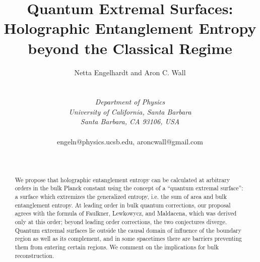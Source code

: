 \documentclass[12pt]{article}
\theoremstyle{remark}
\numberwithin{equation}{section}
\numberwithin{equation}{section}
\begin{document}
\allowdisplaybreaks

\normalem

\title{Quantum Extremal Surfaces: Holographic Entanglement Entropy beyond the Classical Regime}

\author{Netta Engelhardt and Aron C. Wall
\\ 
\\ \\
  \textit{Department of Physics}\\
\textit{University of California, Santa Barbara}\\
\textit{ Santa Barbara, CA 93106, USA} \\ 
 \\ 
\small{engeln@physics.ucsb.edu, aroncwall@gmail.com}}



\date{\ }



\maketitle 


\begin{abstract}
We propose that holographic entanglement entropy can be calculated at arbitrary orders in the bulk Planck constant using the concept of a ``quantum extremal surface'': a surface which extremizes the generalized entropy, i.e. the sum of area and bulk entanglement entropy. At leading order in bulk quantum corrections, our proposal agrees with the formula of Faulkner, Lewkowycz, and Maldacena, which was derived only at this order; beyond leading order corrections, the two conjectures diverge. Quantum extremal surfaces lie outside the causal domain of influence of the boundary region as well as its complement, and in some spacetimes there are barriers preventing them from entering certain regions.  We comment on the implications for bulk reconstruction.



\end{abstract}
\end{document}
